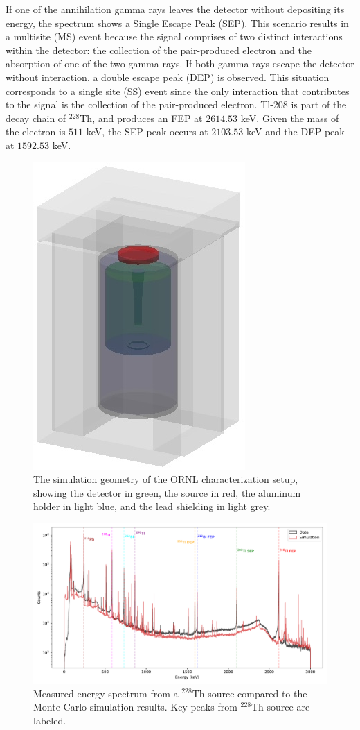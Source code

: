 If one of the annihilation gamma rays leaves the detector without depositing its energy, the spectrum shows a Single Escape Peak (SEP). This scenario results in a multisite (MS) event because the signal comprises of two distinct interactions within the detector: the collection of the pair-produced electron and the absorption of one of the two gamma rays. If both gamma rays escape the detector without interaction, a double escape peak (DEP) is observed. This situation corresponds to a single site (SS) event since the only interaction that contributes to the signal is the collection of the pair-produced electron. Tl-208 is part of the decay chain of $^{228}$Th, and produces an FEP at $2614.53$ keV. Given the mass of the electron is $511$ keV, the SEP peak occurs at $2103.53$ keV and the DEP peak at $1592.53$ keV. 


\begin{figure}%
    \centering
    \includegraphics[width=0.4\linewidth]{ch7/figs/shielding.jpeg}
    \caption{The simulation geometry of the ORNL characterization setup, showing the detector in green, the source in red, the aluminum holder in light blue, and the lead shielding in light grey.}
   \label{ch7_fig_g4simple_setup}
\end{figure}


\begin{figure}%
\centering
    \includegraphics[width=0.99\linewidth,trim={0pc 0pc 0pc 0pc},clip]{ch7/figs/energy_spectrum_comparison.pdf}
    \caption{Measured energy spectrum from a $^{228}$Th source compared to the Monte Carlo simulation results. Key peaks from $^{228}$Th source are labeled.}
   \label{ch7_fig_eng_spec_comp}
\end{figure}

